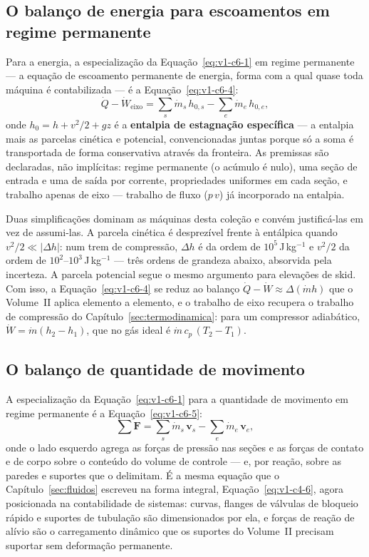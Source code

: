 \documentclass[12pt,a4paper]{article}
\numberwithin{equation}{section}
\numberwithin{table}{section}
\numberwithin{figure}{section}
\begin{document}
\subsection{O balanço de energia para escoamentos em regime
permanente}\label{sub:v1-c6-energia}

Para a energia, a especialização da Equação~\eqref{eq:v1-c6-1} em regime
permanente --- a equação de escoamento permanente de energia, forma com a
qual quase toda máquina é contabilizada --- é a Equação~\eqref{eq:v1-c6-4}:
\begin{equation}\label{eq:v1-c6-4}
\dot{Q} - \dot{W}_{\text{eixo}} = \sum_s \dot{m}_s\,h_{0,s} -
\sum_e \dot{m}_e\,h_{0,e},
\end{equation}
onde $h_0 = h + v^2/2 + gz$ é a \textbf{entalpia de estagnação específica} ---
a entalpia mais as parcelas cinética e potencial, convencionadas juntas porque
só a soma é transportada de forma conservativa através da fronteira. As
premissas são declaradas, não implícitas: regime permanente (o acúmulo é
nulo), uma seção de entrada e uma de saída por corrente, propriedades
uniformes em cada seção, e trabalho apenas de eixo --- trabalho de fluxo
($p\,v$) já incorporado na entalpia.

Duas simplificações dominam as máquinas desta coleção e convém justificá-las
em vez de assumi-las. A parcela cinética é desprezível frente à entálpica
quando $v^2/2 \ll |\Delta h|$: num trem de compressão, $\Delta h$ é da ordem de
$10^5\,$J\,kg$^{-1}$ e $v^2/2$ da ordem de $10^2$--$10^3\,$J\,kg$^{-1}$ --- três
ordens de grandeza abaixo, absorvida pela incerteza. A parcela potencial segue
o mesmo argumento para elevações de skid. Com isso, a
Equação~\eqref{eq:v1-c6-4} se reduz ao balanço $\dot{Q} - \dot{W} \approx
\Delta(\dot{m}h)$ que o Volume~II aplica elemento a elemento, e o trabalho de
eixo recupera o trabalho de compressão do
Capítulo~\ref{sec:termodinamica}: para um compressor adiabático, $\dot{W} =
\dot{m}(h_2 - h_1)$, que no gás ideal é $\dot{m}\,c_p\,(T_2 - T_1)$.

\subsection{O balanço de quantidade de
movimento}\label{sub:v1-c6-momento}

A especialização da Equação~\eqref{eq:v1-c6-1} para a quantidade de movimento
em regime permanente é a Equação~\eqref{eq:v1-c6-5}:
\begin{equation}\label{eq:v1-c6-5}
\sum \mathbf{F} = \sum_s \dot{m}_s\,\mathbf{v}_s -
\sum_e \dot{m}_e\,\mathbf{v}_e ,
\end{equation}
onde o lado esquerdo agrega as forças de pressão nas seções e as forças de
contato e de corpo sobre o conteúdo do volume de controle --- e, por reação,
sobre as paredes e suportes que o delimitam. É a mesma equação que o
Capítulo~\ref{sec:fluidos} escreveu na forma integral,
Equação~\eqref{eq:v1-c4-6}, agora posicionada na contabilidade de sistemas:
curvas, flanges de válvulas de bloqueio rápido e suportes de tubulação são
dimensionados por ela, e forças de reação de alívio são o carregamento
dinâmico que os suportes do Volume~II precisam suportar sem deformação
permanente.
\end{document}
